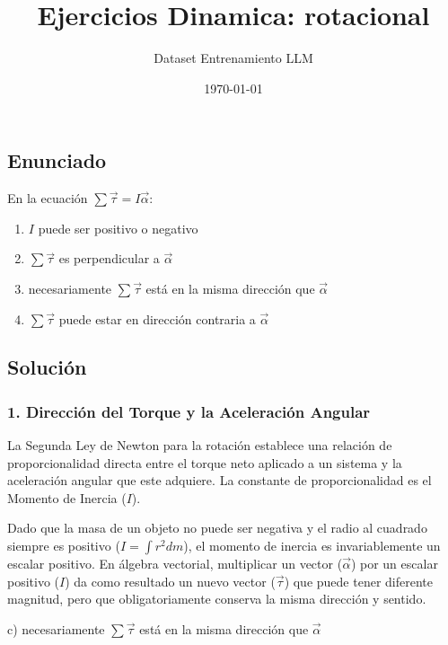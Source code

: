 \documentclass[12pt, a4paper]{article}
\title{Ejercicios Dinamica: rotacional}
\author{Dataset Entrenamiento LLM}
\date{\today}
\begin{document}
\maketitle

\subsection*{Enunciado}
En la ecuación $\sum \vec{\tau} = I \vec{\alpha}$:
\begin{enumerate}[label=\alph*)]
    \item $I$ puede ser positivo o negativo
    \item $\sum \vec{\tau}$ es perpendicular a $\vec{\alpha}$
    \item necesariamente $\sum \vec{\tau}$ está en la misma dirección que $\vec{\alpha}$
    \item $\sum \vec{\tau}$ puede estar en dirección contraria a $\vec{\alpha}$
\end{enumerate}

\subsection*{Solución}

\subsubsection*{1. Dirección del Torque y la Aceleración Angular}

La Segunda Ley de Newton para la rotación establece una relación de proporcionalidad directa entre el torque neto aplicado a un sistema y la aceleración angular que este adquiere. La constante de proporcionalidad es el Momento de Inercia ($I$).

Dado que la masa de un objeto no puede ser negativa y el radio al cuadrado siempre es positivo ($I = \int r^2 dm$), el momento de inercia es invariablemente un escalar positivo. En álgebra vectorial, multiplicar un vector ($\vec{\alpha}$) por un escalar positivo ($I$) da como resultado un nuevo vector ($\vec{\tau}$) que puede tener diferente magnitud, pero que obligatoriamente conserva la misma dirección y sentido.

\begin{tcolorbox}[colback=green!5!white, colframe=green!50!black, title=Respuesta Final]
\centering \Large c) necesariamente $\sum \vec{\tau}$ está en la misma dirección que $\vec{\alpha}$
\end{tcolorbox}
\end{document}
